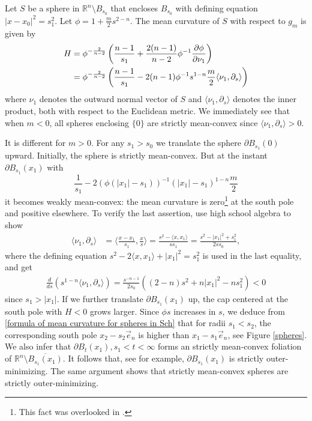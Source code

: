 \documentclass[12pt,twoside]{article}
\theoremstyle{plain}
\theoremstyle{definition}
\theoremstyle{remark}
\newcommand{\pl}{\partial}
\newcommand{\lt}{\left}
\newcommand{\rt}{\right}
\newcommand{\R}{\mathbb{R}}
\numberwithin{equation}{section}
\begin{document}
Let $S$ be a sphere in $\R^n \setminus B_{s_0}$ that encloses $B_{s_0}$ with defining equation $|x - x_0|^2 = s_1^2$. Let $\phi = 1 + \frac{m}{2} s^{2-n}$. The mean curvature of $S$ with respect to $g_m$ is given by
\begin{align}
H &= \phi^{-\frac{2}{n-2}} \lt( \frac{n-1}{s_1} + \frac{2(n-1)}{n-2} \phi^{-1} \frac{\pl\phi}{\pl\nu_1}\rt)\notag\\
&= \phi^{-\frac{2}{n-2}} \lt( \frac{n-1}{s_1} -2 (n-1) \phi^{-1} s^{1-n} \frac{m}{2} \langle \nu_1,\pl_s \rangle \rt) \label{formula of mean curvature for spheres in Sch}
\end{align}
where $\nu_1$ denotes the outward normal vector of $S$ and $\langle \nu_1, \pl_s \rangle$ denotes the inner product, both with respect to the Euclidean metric. We immediately see that when $m<0$, all spheres enclosing $\{ 0\}$ are strictly mean-convex since $\langle \nu_1,\pl_s \rangle > 0$. 

It is different for $m > 0$. For any $s_1 > s_0$  we translate the sphere $\pl B_{s_1}(0)$ upward. Initially, the sphere is strictly mean-convex. But at the instant $\pl B_{s_1}(x_1)$ with
\[ \frac{1}{s_1} - 2 (\phi(|x_1| -s_1))^{-1} (|x_1|-s_1)^{1-n} \frac{m}{2} \] 
it becomes weakly mean-convex: the mean curvature is zero\footnote{This fact was overlooked in \cite{Wei}.} at the south pole and positive elsewhere. To verify the last assertion, use high school algebra to show
\begin{align*}
\langle \nu_1,\pl_s \rangle &= \langle \frac{x-x_1}{s_1}, \frac{x}{s} \rangle = \frac{s^2 - \langle x,x_1 \rangle}{s s_1} = \frac{s^2 - |x_1|^2 + s_1^2}{2s s_0},
\end{align*} 
where the defining equation $s^2 - 2 \langle x,x_1 \rangle + |x_1|^2 = s_1^2$ is used in the last equality, and get 
\begin{align*}
\frac{d}{ds} \lt( s^{1-n} \langle \nu_1,\pl_s \rangle \rt) = \frac{s^{-n-1}}{2s_0} \lt( (2-n)s^2 + n |x_1|^2 - n s_1^2 \rt) < 0
\end{align*}
since $s_1 > |x_1|$. If we further translate $\pl B_{s_1}(x_1)$ up, the cap centered at the south pole with $H < 0$ grows larger.  Since $\phi s$ increases in $s$, we deduce from \eqref{formula of mean curvature for spheres in Sch} that for radii $s_1 < s_2$, the corresponding south pole $x_2 - s_2 \vec e_n$ is higher than $x_1 - s_1 \vec{e}_n$, see Figure \ref{spheres}. We also infer that  $\pl B_{t}(x_1), s_1 < t < \infty$ forms an strictly mean-convex foliation of $\R^n \setminus \overline{ B_{s_1}(x_1)}$. It follows that, see  \cite[Proposition 2.6]{HW} for example, $\pl B_{s_1}(x_1)$ is strictly outer-minimizing. The same argument shows that strictly mean-convex spheres are strictly outer-minimizing.     
\end{document}
